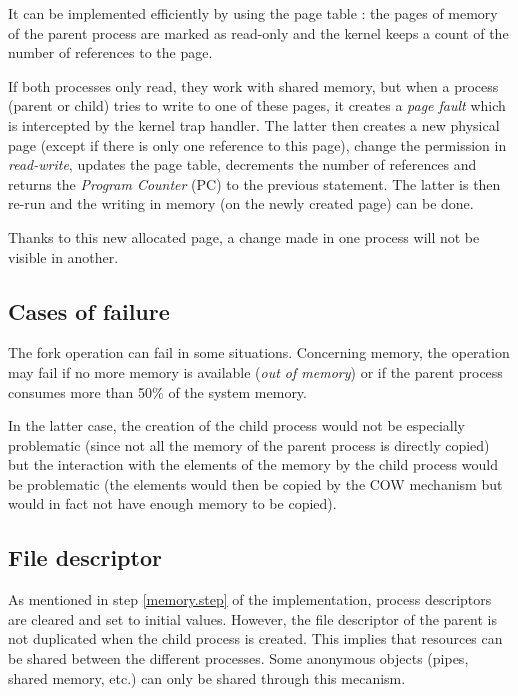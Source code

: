 \documentclass[a4paper, 12pt]{article}
\begin{document}
    It can be implemented efficiently by using the page table : the pages of memory of the parent process are marked as read-only and the kernel keeps a count of the number of references to the page.
    
    If both processes only read, they work with shared memory, but when a process (parent or child) tries to write to one of these pages, it creates a \emph{page fault} which is intercepted by the kernel trap handler. The latter then creates a new physical page (except if there is only one reference to this page), change the permission in \emph{read-write}, updates the page table, decrements the number of references and returns the \emph{Program Counter} (PC) to the previous statement. The latter is then re-run and the writing in memory (on the newly created page) can be done.
    
    Thanks to this new allocated page, a change made in one process will not be visible in another.
    
    \subsection{Cases of failure}
    
    The fork operation can fail in some situations. Concerning memory, the operation may fail if no more memory is available (\emph{out of memory}) or if the parent process consumes more than 50\% of the system memory.
    
    In the latter case, the creation of the child process would not be especially problematic (since not all the memory of the parent process is directly copied) but the interaction with the elements of the memory by the child process would be problematic (the elements would then be copied by the COW mechanism but would in fact not have enough memory to be copied).
    
    \subsection{File descriptor}
    
    As mentioned in step \ref{memory.step} of the implementation, process descriptors are cleared and set to initial values. However, the file descriptor of the parent is not duplicated when the child process is created. This implies that resources can be shared between the different processes. Some anonymous objects (pipes, shared memory, etc.) can only be shared through this mecanism.
    
\end{document}
